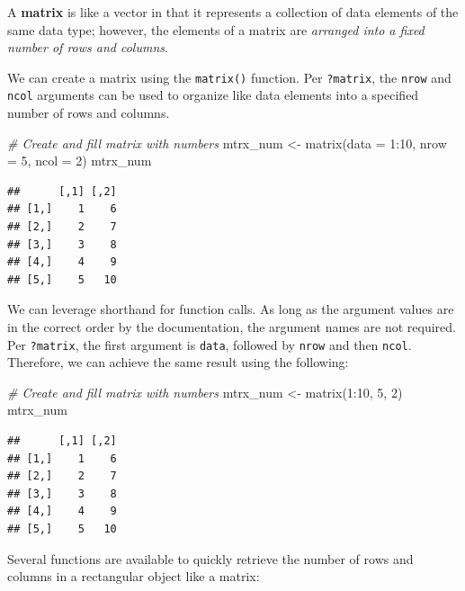 \documentclass[
]{book}
\newenvironment{Shaded}{\begin{snugshade}}{\end{snugshade}}
\newcommand{\AttributeTok}[1]{\textcolor[rgb]{0.77,0.63,0.00}{#1}}
\newcommand{\CommentTok}[1]{\textcolor[rgb]{0.56,0.35,0.01}{\textit{#1}}}
\newcommand{\DecValTok}[1]{\textcolor[rgb]{0.00,0.00,0.81}{#1}}
\newcommand{\FunctionTok}[1]{\textcolor[rgb]{0.00,0.00,0.00}{#1}}
\newcommand{\NormalTok}[1]{#1}
\newcommand{\OtherTok}[1]{\textcolor[rgb]{0.56,0.35,0.01}{#1}}
\newcommand{\SpecialCharTok}[1]{\textcolor[rgb]{0.00,0.00,0.00}{#1}}
\begin{document}
A \textbf{matrix} is like a vector in that it represents a collection of data elements of the same data type; however, the elements of a matrix are \emph{arranged into a fixed number of rows and columns}.

We can create a matrix using the \texttt{matrix()} function. Per \texttt{?matrix}, the \texttt{nrow} and \texttt{ncol} arguments can be used to organize like data elements into a specified number of rows and columns.

\begin{Shaded}
\begin{Highlighting}[]
\CommentTok{\# Create and fill matrix with numbers}
\NormalTok{mtrx\_num }\OtherTok{\textless{}{-}} \FunctionTok{matrix}\NormalTok{(}\AttributeTok{data =} \DecValTok{1}\SpecialCharTok{:}\DecValTok{10}\NormalTok{, }\AttributeTok{nrow =} \DecValTok{5}\NormalTok{, }\AttributeTok{ncol =} \DecValTok{2}\NormalTok{)}
\NormalTok{mtrx\_num}
\end{Highlighting}
\end{Shaded}

\begin{verbatim}
##      [,1] [,2]
## [1,]    1    6
## [2,]    2    7
## [3,]    3    8
## [4,]    4    9
## [5,]    5   10
\end{verbatim}

We can leverage shorthand for function calls. As long as the argument values are in the correct order by the documentation, the argument names are not required. Per \texttt{?matrix}, the first argument is \texttt{data}, followed by \texttt{nrow} and then \texttt{ncol}. Therefore, we can achieve the same result using the following:

\begin{Shaded}
\begin{Highlighting}[]
\CommentTok{\# Create and fill matrix with numbers}
\NormalTok{mtrx\_num }\OtherTok{\textless{}{-}} \FunctionTok{matrix}\NormalTok{(}\DecValTok{1}\SpecialCharTok{:}\DecValTok{10}\NormalTok{, }\DecValTok{5}\NormalTok{, }\DecValTok{2}\NormalTok{)}
\NormalTok{mtrx\_num}
\end{Highlighting}
\end{Shaded}

\begin{verbatim}
##      [,1] [,2]
## [1,]    1    6
## [2,]    2    7
## [3,]    3    8
## [4,]    4    9
## [5,]    5   10
\end{verbatim}

Several functions are available to quickly retrieve the number of rows and columns in a rectangular object like a matrix:
\end{document}
